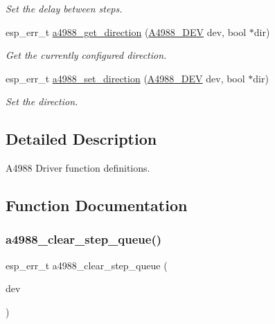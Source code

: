 \begin{DoxyCompactItemize}
\begin{DoxyCompactList}\small\item\em Set the delay between steps. \end{DoxyCompactList}\item 
esp\+\_\+err\+\_\+t \hyperlink{group__A4988__Driver__functions_ga23b84536dd1d56a74440425469f29875}{a4988\+\_\+get\+\_\+direction} (\hyperlink{group__A4988__definitions_ga16590a9dd79ad8fcf4c317be2659b6c5}{A4988\+\_\+\+D\+EV} dev, bool $\ast$dir)
\begin{DoxyCompactList}\small\item\em Get the currently configured direction. \end{DoxyCompactList}\item 
esp\+\_\+err\+\_\+t \hyperlink{group__A4988__Driver__functions_ga3762fb75b81dc81b9348a2c29d0de3bc}{a4988\+\_\+set\+\_\+direction} (\hyperlink{group__A4988__definitions_ga16590a9dd79ad8fcf4c317be2659b6c5}{A4988\+\_\+\+D\+EV} dev, bool $\ast$dir)
\begin{DoxyCompactList}\small\item\em Set the direction. \end{DoxyCompactList}\end{DoxyCompactItemize}


\subsection{Detailed Description}
A4988 Driver function definitions. 



\subsection{Function Documentation}
\mbox{\label{group__A4988__Driver__functions_gaa96b4dada68f3d5b054310e629b7fcdb}} 
\subsubsection{\texorpdfstring{a4988\+\_\+clear\+\_\+step\+\_\+queue()}{a4988\_clear\_step\_queue()}}
{\footnotesize\ttfamily esp\+\_\+err\+\_\+t a4988\+\_\+clear\+\_\+step\+\_\+queue (\begin{DoxyParamCaption}\item[{\hyperlink{group__A4988__definitions_ga16590a9dd79ad8fcf4c317be2659b6c5}{A4988\+\_\+\+D\+EV}}]{dev }\end{DoxyParamCaption})}



